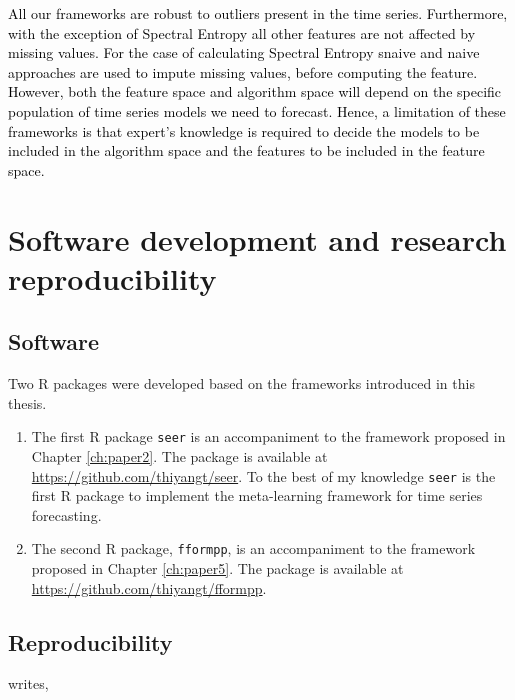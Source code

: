 \documentclass{monashthesis}
\begin{document}
\textcolor{black}{All our frameworks are robust to outliers present in the time series. Furthermore, with the exception of Spectral Entropy all other features are not affected by missing values. For the case of calculating Spectral Entropy snaive and naive approaches are used to impute missing values, before computing the feature. However, both the feature space and algorithm space will depend on the specific population of time series models we need to forecast. Hence, a limitation of these frameworks is that expert's knowledge is required to decide the models to be included in the algorithm space and the features to be included in the feature space.}

\hypertarget{software-development-and-research-reproducibility}{%
\section{Software development and research reproducibility}\label{software-development-and-research-reproducibility}}

\hypertarget{software}{%
\subsection{Software}\label{software}}

Two R packages were developed based on the frameworks introduced in this thesis.

\begin{enumerate}
\def\labelenumi{\arabic{enumi}.}
\item
  The first R package \texttt{seer} is an accompaniment to the framework proposed in Chapter \ref{ch:paper2}.
  The package is available at \url{https://github.com/thiyangt/seer}. To the best of my knowledge \texttt{seer} is the first R package to implement the meta-learning framework for time series forecasting.
\item
  The second R package, \texttt{fformpp}, is an accompaniment to the framework proposed in Chapter \ref{ch:paper5}. The package is available at \url{https://github.com/thiyangt/fformpp}.
\end{enumerate}

\hypertarget{reproducibility}{%
\subsection{Reproducibility}\label{reproducibility}}

\textcite{peng2015reproducibility} writes,
\end{document}
